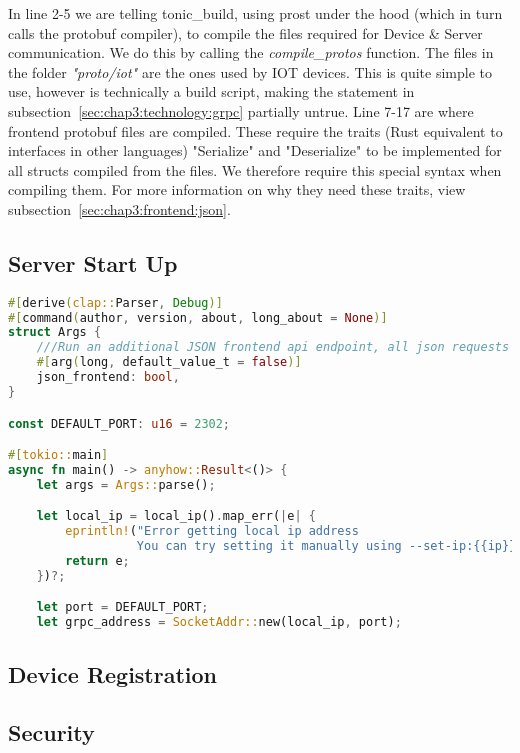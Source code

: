 In line 2-5 we are telling tonic\_build, using prost under the hood (which in turn calls the protobuf compiler), to compile the files required for Device \& Server communication. We do this by calling the \textit{compile\_protos} function. The files in the folder \textit{"proto/iot"} are the ones used by IOT devices. This is quite simple to use, however is technically a build script, making the statement in subsection~\ref{sec:chap3:technology:grpc} partially untrue. Line 7-17 are where frontend protobuf files are compiled. These require the traits (Rust equivalent to interfaces in other languages) "Serialize" and "Deserialize" to be implemented for all structs compiled from the files. We therefore require this special syntax when compiling them. For more information on why they need these traits, view subsection~\ref{sec:chap3:frontend:json}.

\subsection{Server Start Up} \label{sec:chap3:server:startup}
\begin{lstlisting}[language=Rust, style=boxed, showstringspaces=false]
#[derive(clap::Parser, Debug)]
#[command(author, version, about, long_about = None)]
struct Args {
    ///Run an additional JSON frontend api endpoint, all json requests get routed to main GRPC
    #[arg(long, default_value_t = false)]
    json_frontend: bool,
}

const DEFAULT_PORT: u16 = 2302;

#[tokio::main]
async fn main() -> anyhow::Result<()> {
    let args = Args::parse();

    let local_ip = local_ip().map_err(|e| {
        eprintln!("Error getting local ip address
                  You can try setting it manually using --set-ip:{{ip}}"); 
        return e;
    })?;

    let port = DEFAULT_PORT;
    let grpc_address = SocketAddr::new(local_ip, port);
\end{lstlisting}
\subsection{Device Registration} \label{sec:chap3:server:registration}


\subsection{Security} \label{sec:chap3:server:security}

